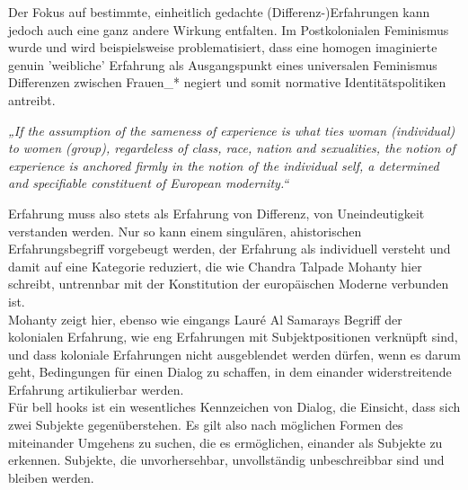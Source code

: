 \noindent Der Fokus auf bestimmte, einheitlich gedachte (Differenz-)Erfahrungen kann
jedoch auch eine ganz andere Wirkung entfalten. Im Postkolonialen Feminismus
wurde und wird beispielsweise problematisiert, dass eine homogen imaginierte
genuin 'weibliche' Erfahrung als Ausgangspunkt eines universalen Feminismus
Differenzen zwischen Frauen\_* negiert und somit normative Identitätspolitiken
antreibt.
\begin{myenv}
  \textit{
  „If the assumption of the sameness of experience is what ties woman
  (individual) to women (group), regardeless of class, race, nation and
  sexualities, the notion of experience is anchored firmly in the notion of the
  individual self, a determined and specifiable constituent of European
  modernity.“\footnotemark {}
  }
\end{myenv}
Erfahrung muss also stets als Erfahrung von Differenz, von Uneindeutigkeit
verstanden werden. Nur so kann einem singulären, ahistorischen
Erfahrungsbegriff vorgebeugt werden, der Erfahrung als individuell versteht und
damit auf eine Kategorie reduziert, die wie Chandra Talpade Mohanty hier
schreibt, untrennbar mit der Konstitution der europäischen Moderne verbunden
ist.\footnotemark{}\\

Mohanty zeigt hier, ebenso wie eingangs Lauré Al Samarays Begriff der
kolonialen Erfahrung, wie eng Erfahrungen mit Subjektpositionen verknüpft sind,
und dass koloniale Erfahrungen nicht ausgeblendet werden dürfen, wenn es darum
geht, Bedingungen für einen Dialog zu schaffen, in dem einander widerstreitende
Erfahrung artikulierbar werden.\\

Für bell hooks ist ein wesentliches Kennzeichen
von Dialog, die Einsicht, dass sich zwei Subjekte
gegenüberstehen.\footnotemark{} Es gilt
also nach möglichen Formen des miteinander Umgehens zu suchen, die es
ermöglichen, einander als Subjekte zu erkennen. Subjekte, die unvorhersehbar,
unvollständig unbeschreibbar sind und bleiben werden.\\

